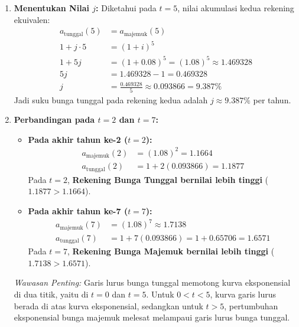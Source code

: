 \documentclass[11pt,a4paper]{article}
\begin{document}
\begin{solutionbox}[Soal 6]
\begin{enumerate}[label=(\alph*)]
    \item \textbf{Menentukan Nilai $j$:}
    Diketahui pada $t = 5$, nilai akumulasi kedua rekening ekuivalen:
    \begin{align*}
        a_{\text{tunggal}}(5) &= a_{\text{majemuk}}(5) \\
        1 + j \cdot 5 &= (1 + i)^5 \\
        1 + 5j &= (1 + 0.08)^5 = (1.08)^5 \approx 1.469328 \\[0.3em]
        5j &= 1.469328 - 1 = 0.469328 \\
        j &= \frac{0.469328}{5} \approx 0.093866 = \mathbf{9.387\%}
    \end{align*}
    Jadi suku bunga tunggal pada rekening kedua adalah $j \approx 9.387\%$ per tahun.

    \item \textbf{Perbandingan pada $t = 2$ dan $t = 7$:}
    \begin{itemize}
        \item \textbf{Pada akhir tahun ke-2 ($t = 2$):}
        \begin{align*}
            a_{\text{majemuk}}(2) &= (1.08)^2 = \mathbf{1.1664} \\
            a_{\text{tunggal}}(2) &= 1 + 2(0.093866) = \mathbf{1.1877}
        \end{align*}
        Pada $t = 2$, \textbf{Rekening Bunga Tunggal bernilai lebih tinggi} ($1.1877 > 1.1664$).
        
        \item \textbf{Pada akhir tahun ke-7 ($t = 7$):}
        \begin{align*}
            a_{\text{majemuk}}(7) &= (1.08)^7 \approx \mathbf{1.7138} \\
            a_{\text{tunggal}}(7) &= 1 + 7(0.093866) = 1 + 0.65706 = \mathbf{1.6571}
        \end{align*}
        Pada $t = 7$, \textbf{Rekening Bunga Majemuk bernilai lebih tinggi} ($1.7138 > 1.6571$).
    \end{itemize}
    \textit{Wawasan Penting:} Garis lurus bunga tunggal memotong kurva eksponensial di dua titik, yaitu di $t = 0$ dan $t = 5$. Untuk $0 < t < 5$, kurva garis lurus berada di atas kurva eksponensial, sedangkan untuk $t > 5$, pertumbuhan eksponensial bunga majemuk melesat melampaui garis lurus bunga tunggal.
\end{enumerate}
\end{solutionbox}
\end{document}

